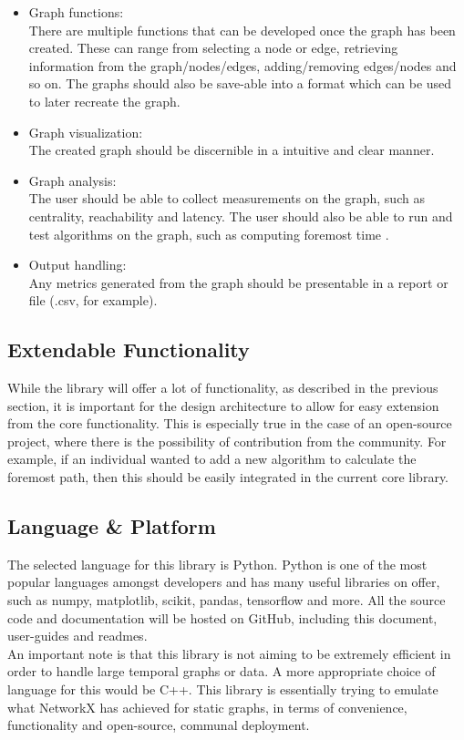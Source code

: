 \begin{specification}
\begin{itemize}
    \item Graph functions:\\
    There are multiple functions that can be developed once the graph has been created. These can range from selecting a node or edge, retrieving information from the graph/nodes/edges, adding/removing edges/nodes and so on. The graphs should also be save-able into a format which can be used to later recreate the graph. 
    \item Graph visualization:\\
    The created graph should be discernible in a intuitive and clear manner.
    \item Graph analysis:\\
    The user should be able to collect measurements on the graph, such as centrality, reachability and latency. The user should also be able to run and test algorithms on the graph, such as computing foremost time \cite{efficient_algorithms}.
    \item Output handling:\\
    Any metrics generated from the graph should be presentable in a report or file (.csv, for example).
\end{itemize}
\clearpage
\subsection{Extendable Functionality}
While the library will offer a lot of functionality, as described in the previous section, it is important for the design architecture to allow for easy extension from the core functionality. This is especially true in the case of an open-source project, where there is the possibility of contribution from the community. For example, if an individual wanted to add a new algorithm to calculate the foremost path, then this should be easily integrated in the current core library.
\subsection{Language \& Platform}
The selected language for this library is Python. Python is one of the most popular languages amongst developers and has many useful libraries on offer, such as numpy, matplotlib, scikit, pandas, tensorflow and more. All the source code and documentation will be hosted on GitHub, including this document, user-guides and readmes.\\
An important note is that this library is not aiming to be extremely efficient in order to handle large temporal graphs or data. A more appropriate choice of language for this would be C++. This library is essentially trying to emulate what NetworkX \cite{NetworkX} has achieved for static graphs, in terms of convenience, functionality and open-source, communal deployment.

\end{specification}
